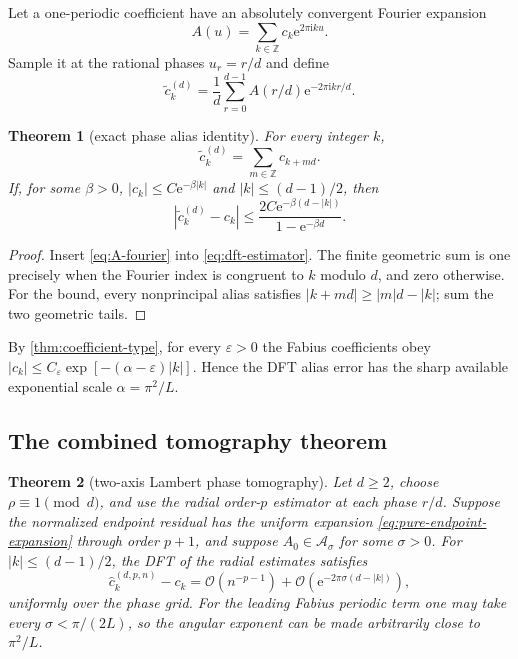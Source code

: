 \documentclass[11pt,oneside]{article}
\numberwithin{equation}{section}
\newtheorem{theorem}{Theorem}[section]
\theoremstyle{definition}
\theoremstyle{remark}
\newcommand{\Z}{\mathbb Z}
\newcommand{\e}{\mathrm e}
\newcommand{\ii}{\mathrm i}
\newcommand{\bigO}{\mathcal O}
\newcommand{\Wiener}{\mathcal A}
\begin{document}
Let a one-periodic coefficient have an absolutely convergent Fourier expansion
\begin{equation}
 A(u)=\sum_{k\in\Z}c_k\e^{2\pi\ii ku}.
 \label{eq:A-fourier}
\end{equation}
Sample it at the rational phases $u_r=r/d$ and define
\begin{equation}
 \widetilde c_k^{(d)}
 =\frac1d\sum_{r=0}^{d-1}A(r/d)\e^{-2\pi\ii kr/d}.
 \label{eq:dft-estimator}
\end{equation}

\begin{theorem}[exact phase alias identity]
\label{thm:phase-alias}
For every integer $k$,
\begin{equation}
 \boxed{\displaystyle
 \widetilde c_k^{(d)}=\sum_{m\in\Z}c_{k+md}.}
 \label{eq:phase-alias}
\end{equation}
If, for some $\beta>0$, $|c_k|\le C\e^{-\beta|k|}$ and
$|k|\le(d-1)/2$, then
\begin{equation}
 |\widetilde c_k^{(d)}-c_k|
 \le\frac{2C\e^{-\beta(d-|k|)}}{1-\e^{-\beta d}}.
 \label{eq:alias-bound}
\end{equation}
\end{theorem}

\begin{proof}
Insert \eqref{eq:A-fourier} into \eqref{eq:dft-estimator}.  The finite geometric
sum is one precisely when the Fourier index is congruent to $k$ modulo $d$, and zero
otherwise.  For the bound, every nonprincipal alias satisfies
$|k+md|\ge |m|d-|k|$; sum the two geometric tails.
\end{proof}

By \cref{thm:coefficient-type}, for every $\varepsilon>0$ the Fabius coefficients obey
$|c_k|\le C_\varepsilon\exp[-(\alpha-\varepsilon)|k|]$.  Hence the DFT alias error has the
sharp available exponential scale $\alpha=\pi^2/L$.

\subsection{The combined tomography theorem}

\begin{theorem}[two-axis Lambert phase tomography]
\label{thm:two-axis}
Let $d\ge2$, choose $\rho\equiv1\pmod d$, and use the radial order-$p$ estimator at each
phase $r/d$.  Suppose the normalized endpoint residual has the uniform expansion
\eqref{eq:pure-endpoint-expansion} through order $p+1$, and suppose
$A_0\in\Wiener_\sigma$ for some $\sigma>0$.  For
$|k|\le(d-1)/2$, the DFT of the radial estimates satisfies
\begin{equation}
 \widehat c_{k}^{(d,p,n)}-c_k
 =\bigO(n^{-p-1})
 +\bigO\!\left(\e^{-2\pi\sigma(d-|k|)}\right),
 \label{eq:two-axis-error}
\end{equation}
uniformly over the phase grid.  For the leading Fabius periodic term one may take every
$\sigma<\pi/(2L)$, so the angular exponent can be made arbitrarily close to
$\pi^2/L$.
\end{theorem}
\end{document}
